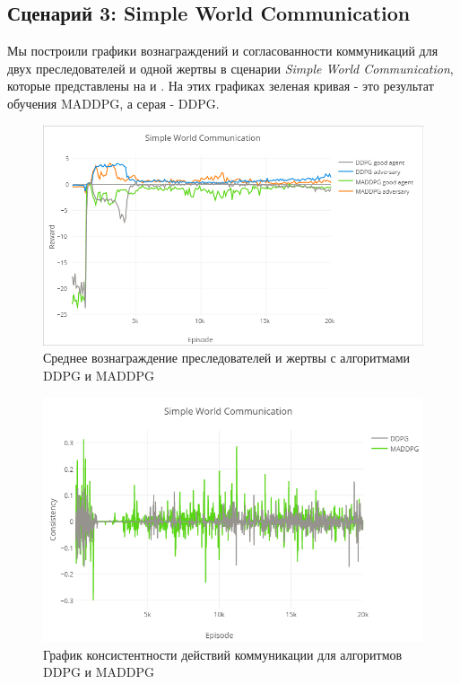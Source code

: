 \subsection{Сценарий 3: Simple World Communication} \label{exp-results-svc}

Мы построили графики вознаграждений и согласованности коммуникаций для двух преследователей и одной жертвы в сценарии \textit{Simple World Communication}, которые представлены на  и . На этих графиках зеленая кривая - это результат обучения MADDPG, а серая - DDPG.

\begin{figure}[ht!]
	\center
	\includegraphics [scale=0.6] {my_folder/images/ch5/swc-rew.png}
	\caption{Среднее вознаграждение преследователей и жертвы с алгоритмами DDPG и MADDPG}
	\label{fig:result-swc-rew}
\end{figure}

\begin{figure}[ht!]
	\center
	\includegraphics [scale=0.6] {my_folder/images/ch5/swc-comm.png}
	\caption{График консистентности действий коммуникации для алгоритмов DDPG и MADDPG}
	\label{fig:result-swc-comm}
\end{figure}

